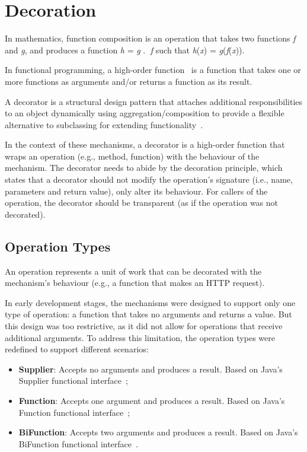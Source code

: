 \section{Decoration}\label{sec:decoration}

In mathematics,
function composition is an operation that takes two functions \textit{f} and \textit{g}, and produces a function \textit{h} = \textit{g} \textcircled{.} \textit{f} such that \textit{h}(\textit{x}) = \textit{g}(\textit{f}(\textit{x})).

In functional programming, a high-order function~\cite{higher-order-functions} is a function
that takes one or more functions as arguments and/or returns a function as its result.

A decorator is a structural design pattern
that attaches additional responsibilities to an object dynamically using aggregation/composition to provide a flexible alternative to subclassing for extending functionality~\cite{design-patterns}.

In the context of these mechanisms,
a decorator is a high-order function that wraps an operation
(e.g., method, function) with the behaviour of the mechanism.
The decorator needs to abide by the decoration principle,
which states that a decorator should not modify the operation's signature (i.e., name, parameters and return value), only alter its behaviour.
For callers of the operation, the decorator should be transparent (as if the operation was not decorated).

\subsection{Operation Types}\label{subsec:operation-types}

An operation represents a unit of work that can be decorated with the mechanism's behaviour (e.g., a function that makes an HTTP request).

In early development stages, the mechanisms were designed to support only one type of operation:
a function that takes no arguments and returns a value.
But this design was too restrictive, as it did not allow for operations that receive additional arguments.
To address this limitation, the operation types were redefined to support different scenarios:

\begin{itemize}
    \item \textbf{Supplier}: Accepts no arguments and produces a result.
    Based on Java's Supplier functional interface~\cite{java-supplier};
    \item \textbf{Function}: Accepts one argument and produces a result.
    Based on Java's Function functional interface~\cite{java-function};
    \item \textbf{BiFunction}: Accepts two arguments and produces a result.
    Based on Java's BiFunction functional interface~\cite{java-bifunction}.
\end{itemize}

